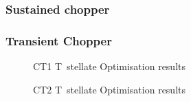 \subsubsection{Sustained chopper}


\subsubsection{Transient Chopper}
\begin{figure}[htb]
  \centering
  \caption[CT1 T~stellate Optimisation results]{CT1 T~stellate Optimisation results}
  \label{fig:CT1results}
\end{figure}

\begin{figure}[htb]
  \centering
  \caption[CT2 T~stellate Optimisation results]{CT2 T~stellate Optimisation results}
  \label{fig:CT2results}
\end{figure}



